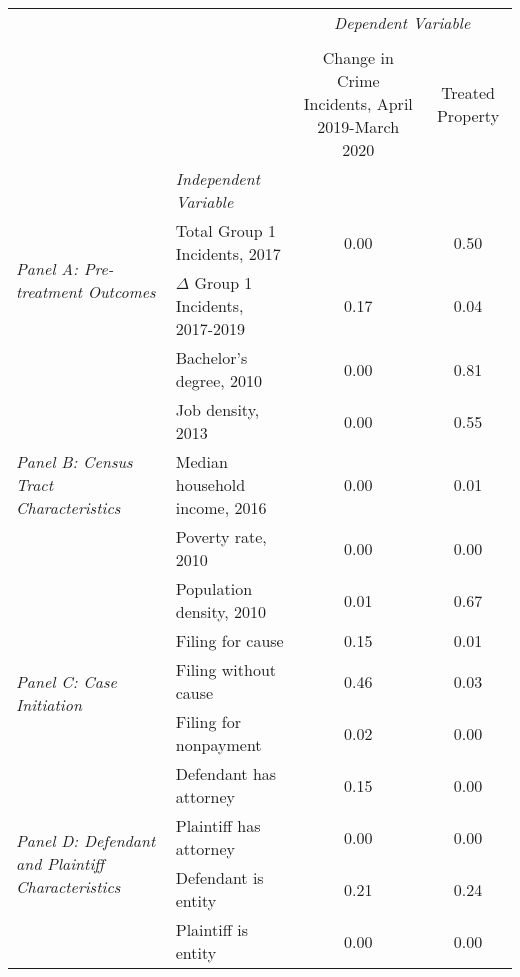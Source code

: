 \begin{tabular}{llcc}
\toprule
 &  & \multicolumn{2}{c}{\textit{Dependent Variable}} \\
\cline{3-4}
\\
 &  & Change in Crime Incidents, April 2019-March 2020 & Treated Property \\
 & \emph{Independent Variable} &  &  \\
\midrule
\multirow[c]{2}{3cm}{\textit{Panel A: Pre-treatment Outcomes}} & Total Group 1 Incidents, 2017 & 0.00 & 0.50 \\
 & $\Delta$ Group 1 Incidents, 2017-2019 & 0.17 & 0.04 \\
\cline{1-4}
\multirow[c]{5}{3cm}{\textit{Panel B: Census Tract Characteristics}} & Bachelor's degree, 2010 & 0.00 & 0.81 \\
 & Job density, 2013 & 0.00 & 0.55 \\
 & Median household income, 2016 & 0.00 & 0.01 \\
 & Poverty rate, 2010 & 0.00 & 0.00 \\
 & Population density, 2010 & 0.01 & 0.67 \\
\cline{1-4}
\multirow[c]{3}{3cm}{\textit{Panel C: Case Initiation}} & Filing for cause & 0.15 & 0.01 \\
 & Filing without cause & 0.46 & 0.03 \\
 & Filing for nonpayment & 0.02 & 0.00 \\
\cline{1-4}
\multirow[c]{4}{3cm}{\textit{Panel D: Defendant and Plaintiff Characteristics}} & Defendant has attorney & 0.15 & 0.00 \\
 & Plaintiff has attorney & 0.00 & 0.00 \\
 & Defendant is entity & 0.21 & 0.24 \\
 & Plaintiff is entity & 0.00 & 0.00 \\
\cline{1-4}
\bottomrule
\end{tabular}
